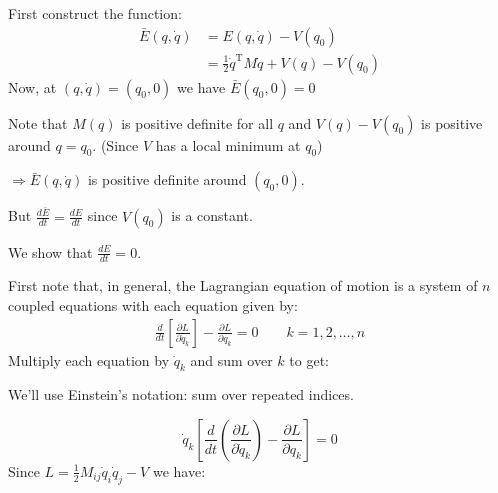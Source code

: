 \begin{solution}
First construct the function:
\begin{align}
	\bar{E}(q, \dot{q}) &= E(q, \dot{q}) - V(q_0) \\
	&= \frac{1}{2}\dot{q}^\text{T}M\dot{q} + V(q) - V(q_0)
\end{align}
Now, at $(q,\dot{q})=(q_0,0)$ we have $\bar{E}(q_0,0)=0$

Note that $M(q)$ is positive definite for all $q$ and $V(q) - V(q_0)$ is positive around $q=q_0$. (Since $V$ has a local minimum at $q_0$)

$\Longrightarrow \bar{E}(q,\dot{q})$ is positive definite around $(q_0,0)$.

But $\displaystyle \frac{d\bar{E}}{dt} = \frac{dE}{dt}$ since $V(q_0)$ is a constant.

We show that $\displaystyle \frac{dE}{dt}=0$.

First note that, in general, the Lagrangian equation of motion is a system of $n$ coupled equations with each equation given by:
\begin{align}
	\frac{d}{dt} \left[ \frac{\partial L}{\partial \dot{q}_k} \right] - \frac{\partial L}{\partial q_k} =0 \qquad k = 1,2,\ldots,n
\end{align}
Multiply each equation by $\dot{q}_k$ and sum over $k$ to get:

We'll use Einstein's notation: sum over repeated indices.

\begin{equation}\label{S03E041}
	\dot{q}_k \left[ \frac{d}{dt}\left( \frac{\partial L}{\partial \dot{q}_k} \right) - \frac{\partial L}{\partial q_k} \right] =0
\end{equation}
Since $\displaystyle L = \frac{1}{2}M_{ij}\dot{q}_i \dot{q}_j - V$ we have:


\end{solution}
